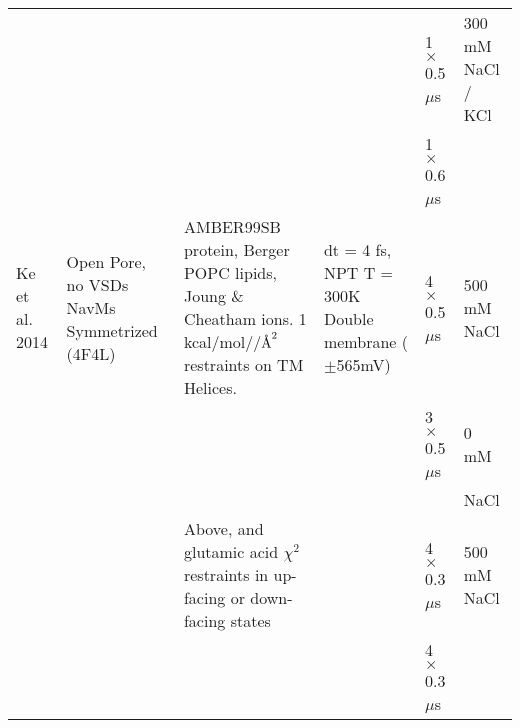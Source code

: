 \begin{refsection}
\begin{table}[]
\begin{threeparttable}
\begin{tabular}{ | p{1.5cm} | p{2.5cm} | p{3cm} | p{3cm} | p{2cm} | p{1cm} |}
                         &                                    &                                                                                                                                                       &                                                                & 1 $\times$ 0.5 $\mu$s                & 300 mM NaCl / KCl         \\
                         &                                                                   &                                                                                                                                                       &                                                                & 1 $\times$ 0.6 $\mu$s                &                           \\
Ke et al. 2014           & Open Pore, no VSDs  NavMs Symmetrized (4F4L)\tnote{3}                                                       & AMBER99SB protein,\tnote{f} Berger POPC lipids,\tnote{i}  Joung \& Cheatham ions.\tnote{j}  1 kcal/mol//$\textup{\AA}^{2}$ restraints on TM Helices.                   & dt = 4 fs, NPT T = 300K  Double membrane ($\pm$565mV)              & 4 $\times$ 0.5 $\mu$s                & 500 mM NaCl               \\
                         &                                 &                                                                                                                                                       &                                                                & 3 $\times$ 0.5 $\mu$s                & 0 mM                      \\
                         &                                                                   &                                                                                                                                                       &                                                                &                           & NaCl                      \\
                         &                                                                   & Above, and glutamic acid $\chi^{2}$  restraints in up-facing or down-facing states                                                                            &                                                                & 4 $\times$ 0.3 $\mu$s                & 500 mM NaCl               \\
                         &                                                                   &                                                                                                                                                       &                                                                & 4 $\times$ 0.3 $\mu$s                &                           \\

\end{tabular}
\end{threeparttable}
\end{table}
\end{refsection}
